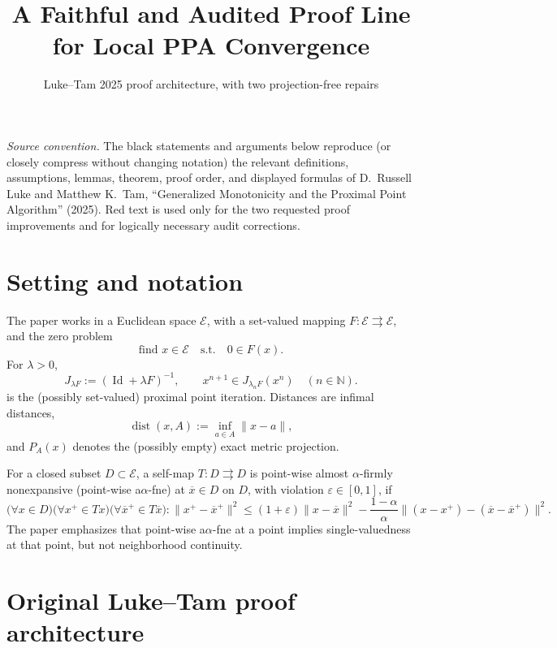 \documentclass[11pt]{article}
\title{A Faithful and Audited Proof Line for Local PPA Convergence}
\author{Luke--Tam 2025 proof architecture, with two projection-free repairs}
\date{}
\newcommand{\E}{\mathcal E}
\newcommand{\dist}{\operatorname{dist}}
\newcommand{\Id}{\operatorname{Id}}
\newcommand{\barx}{\overline{x}}
\begin{document}
\maketitle

\noindent\textit{Source convention.} The black statements and arguments below reproduce (or closely compress without changing notation) the relevant definitions, assumptions, lemmas, theorem, proof order, and displayed formulas of D.~Russell Luke and Matthew K.~Tam, ``Generalized Monotonicity and the Proximal Point Algorithm'' (2025). Red text is used only for the two requested proof improvements and for logically necessary audit corrections.

\section{Setting and notation}

The paper works in a Euclidean space \(\E\), with a set-valued mapping \(F:\E\rightrightarrows\E\), and the zero problem
\begin{equation}
  \text{find }x\in\E\quad\text{s.t.}\quad 0\in F(x).                 \tag{1}
\end{equation}
For \(\lambda>0\),
\begin{equation}
 J_{\lambda F}:=(\Id+\lambda F)^{-1},\qquad
 x^{n+1}\in J_{\lambda_nF}(x^n)\quad(n\in\mathbb N).                 \tag{2}
\end{equation}
is the (possibly set-valued) proximal point iteration. Distances are infimal distances,
\[
\dist(x,A):=\inf_{a\in A}\|x-a\|,
\]
and \(P_A(x)\) denotes the (possibly empty) exact metric projection.

For a closed subset \(D\subset\E\), a self-map \(T:D\rightrightarrows D\) is point-wise almost \(\alpha\)-firmly nonexpansive (point-wise a\(\alpha\)-fne) at \(\barx\in D\) on \(D\), with violation \(\varepsilon\in[0,1]\), if
\begin{equation}
\bigl(\forall x\in D\bigr)\bigl(\forall x^+\in Tx\bigr)\bigl(\forall \barx^+\in T\barx\bigr):
\|x^+-\barx^+\|^2\le (1+\varepsilon)\|x-\barx\|^2-
\frac{1-\alpha}{\alpha}\|(x-x^+)-(\barx-\barx^+)\|^2 .       \tag{3}
\end{equation}
The paper emphasizes that point-wise a\(\alpha\)-fne at a point implies single-valuedness at that point, but not neighborhood continuity.

\section{Original Luke--Tam proof architecture}
\end{document}
